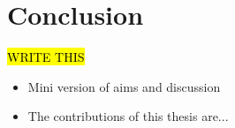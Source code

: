 
\chapter{Conclusion}
\label{chap:conclusion}

\hl{WRITE THIS}

\begin{itemize}
\item Mini version of aims and discussion
\item The contributions of this thesis are...
\end{itemize}